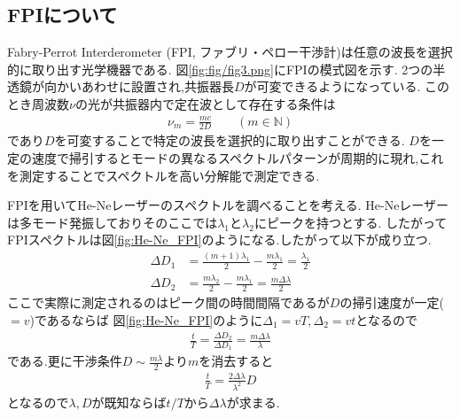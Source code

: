 \subsection{FPIについて}
Fabry-Perrot Interderometer (FPI, ファブリ・ペロー干渉計)は任意の波長を選択的に取り出す光学機器である.
図\ref{fig:fig/fig3.png}にFPIの模式図を示す.
2つの半透鏡が向かいあわせに設置され,共振器長$D$が可変できるようになっている.
このとき周波数$\nu$の光が共振器内で定在波として存在する条件は
\begin{align}
  \nu_m=\frac{mc}{2D}\qquad(m\in\mathbb{N})
\end{align}
であり$D$を可変することで特定の波長を選択的に取り出すことができる.
$D$を一定の速度で掃引するとモードの異なるスペクトルパターンが周期的に現れ,これを測定することでスペクトルを高い分解能で測定できる.

FPIを用いてHe-Neレーザーのスペクトルを調べることを考える.
He-Neレーザーは多モード発振しておりそのここでは$\lambda_1$と$\lambda_2$にピークを持つとする.
したがってFPIスペクトルは図\ref{fig:He-Ne_FPI}のようになる.したがって以下が成り立つ.
\begin{align}
  \Delta D_1&=\frac{(m+1)\lambda_1}{2}-\frac{m\lambda_1}{2}=\frac{\lambda_1}{2}\\
  \Delta D_2&=\frac{m\lambda_2}{2}-\frac{m\lambda_1}{2}=\frac{m\Delta\lambda}{2}
\end{align}
ここで実際に測定されるのはピーク間の時間間隔であるが$D$の掃引速度が一定($=v$)であるならば
図\ref{fig:He-Ne_FPI}のように$\Delta_1=vT,\Delta_2=vt$となるので
\begin{align}
  \frac{t}{T}=\frac{\Delta D_2}{\Delta D_1}=\frac{m\Delta\lambda}{\lambda}
\end{align}
である.更に干渉条件$D\sim\frac{m\lambda}{2}$より$m$を消去すると
\begin{align}
  \frac{t}{T}=\frac{2\Delta\lambda}{\lambda^2}D
\end{align}
となるので$\lambda,D$が既知ならば$t/T$から$\Delta\lambda$が求まる.
